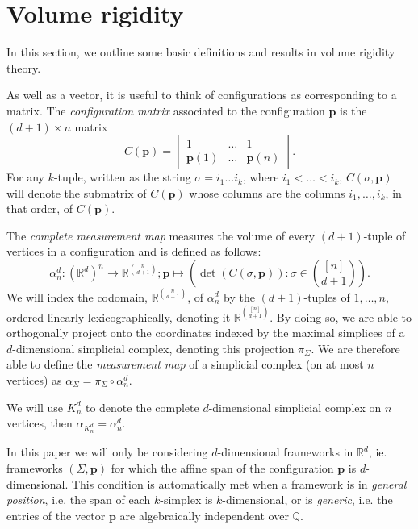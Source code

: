 \documentclass[11pt]{amsart}
\theoremstyle{definition}
\theoremstyle{remark}
\newcommand*{\defn}[1]{{\color{purple}\textit{#1}}}
\begin{document}
\section{Volume rigidity}\label{sec:volrig}

In this section, we outline some basic definitions and results in volume rigidity theory.

As well as a vector, it is useful to think of configurations as corresponding to a matrix.
The \defn{configuration matrix} associated to the configuration $\mathbf{p}$ is the $(d+1)\times n$ matrix 
\begin{equation*}
    C(\mathbf{p})=\begin{bmatrix} 1 & \dots & 1 \\ \mathbf{p}(1) & \dots & \mathbf{p}(n) \end{bmatrix}.
\end{equation*}
For any $k$-tuple, written as the string $\sigma=i_1\dots i_k$, where $i_1<\dots<i_k$, $C(\sigma,\mathbf{p})$ will denote the submatrix of $C(\mathbf{p})$ whose columns are the columns $i_1,\dots,i_k$, in that order, of $C(\mathbf{p})$.

The \defn{complete measurement map} measures the volume of every $(d+1)$-tuple of vertices in a configuration and is defined as follows:
\begin{equation*}
    \alpha_n^d:(\mathbb{R}^d)^n\rightarrow\mathbb{R}^{\binom{n}{d+1}}; \mathbf{p}\mapsto\left(\det(C(\sigma,\mathbf{p})):\sigma\in\binom{[n]}{d+1}\right).
\end{equation*}
We will index the codomain, $\mathbb{R}^{\binom{n}{d+1}}$, of $\alpha_n^d$ by the $(d+1)$-tuples of $1,\dots,n$, ordered linearly lexicographically, denoting it $\mathbb{R}^{\binom{[n]}{d+1}}$.
By doing so, we are able to orthogonally project onto the coordinates indexed by the maximal simplices of a $d$-dimensional simplicial complex, denoting this projection $\pi_{\Sigma}$.
We are therefore able to define the \defn{measurement map} of a simplicial complex (on at most $n$ vertices) as $\alpha_{\Sigma}=\pi_{\Sigma}\circ\alpha_n^d$.

We will use $K_n^d$ to denote the complete $d$-dimensional simplicial complex on $n$ vertices, then $\alpha_{K_n^d}=\alpha_n^d$.

In this paper we will only be considering $d$-dimensional frameworks in $\mathbb{R}^d$, ie. frameworks $(\Sigma,\mathbf{p})$ for which the affine span of the configuration $\mathbf{p}$ is $d$-dimensional.
This condition is automatically met when a framework is in \defn{general position}, i.e. the span of each $k$-simplex is $k$-dimensional, or is \defn{generic}, i.e. the entries of the vector $\mathbf{p}$ are algebraically independent over $\mathbb{Q}$.
\end{document}
